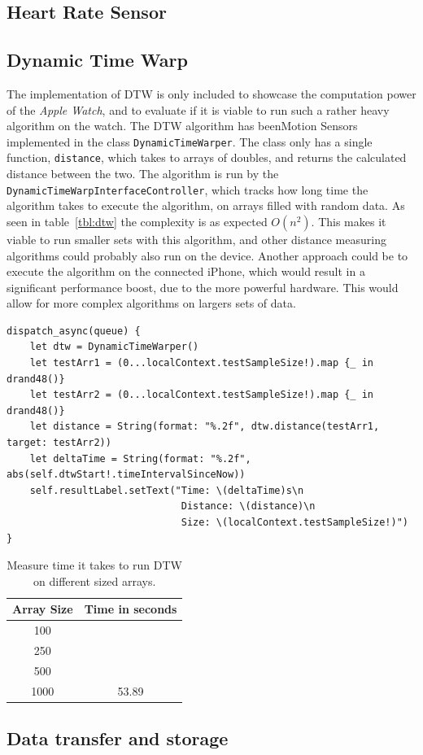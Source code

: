 \subsection{Heart Rate Sensor}

\subsection{Dynamic Time Warp}
The implementation of DTW is only included to showcase the computation power of
the \textit{Apple Watch}, and to evaluate if it is viable to run such a rather
heavy algorithm on the watch.
The DTW algorithm has beenMotion Sensors implemented in the class
\texttt{DynamicTimeWarper}. The class only has a single function,
    \texttt{distance}, which takes to arrays of doubles, and returns the
    calculated distance between the two. The algorithm is run by the
    \texttt{DynamicTimeWarpInterfaceController}, which tracks how long time the
    algorithm takes to execute the algorithm, on arrays filled with random data. 
As seen in table~\ref{tbl:dtw} the complexity is as expected $O(n^2)$.
This makes it viable to run smaller sets with this algorithm, and other distance
measuring algorithms could probably also run on the device.
Another approach could be to execute the algorithm on the connected iPhone,
which would result in a significant performance boost, due to the more powerful
hardware. This would allow for more complex algorithms on largers sets of data.


\begin{lstlisting}[label={lst:dtw},caption={Testing of the implemented DTW
    algorithm, within the DynamicTimeWarpInterfaceController}]
dispatch_async(queue) {
    let dtw = DynamicTimeWarper()
    let testArr1 = (0...localContext.testSampleSize!).map {_ in drand48()}
    let testArr2 = (0...localContext.testSampleSize!).map {_ in drand48()}
    let distance = String(format: "%.2f", dtw.distance(testArr1, target: testArr2))
    let deltaTime = String(format: "%.2f", abs(self.dtwStart!.timeIntervalSinceNow))
    self.resultLabel.setText("Time: \(deltaTime)s\n
                              Distance: \(distance)\n
                              Size: \(localContext.testSampleSize!)")
}
\end{lstlisting}

\begin{table}[!h]
\caption{Measure time it takes to run DTW on different sized arrays.}
\label{tbl:rec}
\centering
\begin{tabular}{ |c|c|  }
\hline
Array Size  & Time in seconds\\
\hline
100    &        \\
250    &        \\
500    &        \\
1000   & 53.89  \\
\hline
\end{tabular}
\end{table}

\subsection{Data transfer and storage}

